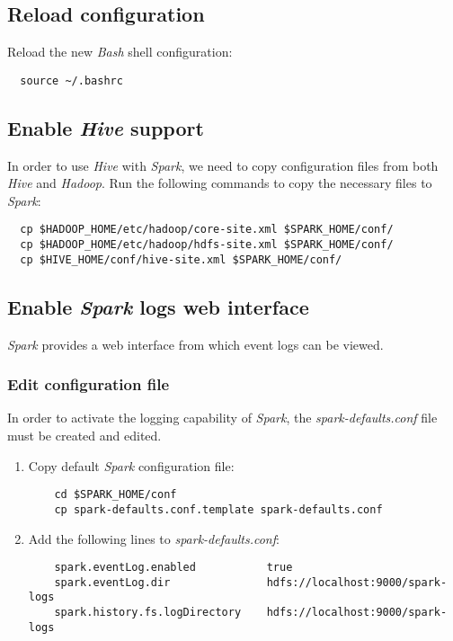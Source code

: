 \documentclass{article}
\begin{document}
  \subsection{Reload configuration}
  Reload the new \emph{Bash} shell configuration:
  \begin{verbatim}
  source ~/.bashrc
  \end{verbatim}

  \subsection{Enable \emph{Hive} support}
  In order to use \emph{Hive} with \emph{Spark}, we need to copy configuration files from both
  \emph{Hive} and \emph{Hadoop}. Run the following commands to copy the necessary files to
  \emph{Spark}:
  \begin{verbatim}
  cp $HADOOP_HOME/etc/hadoop/core-site.xml $SPARK_HOME/conf/
  cp $HADOOP_HOME/etc/hadoop/hdfs-site.xml $SPARK_HOME/conf/
  cp $HIVE_HOME/conf/hive-site.xml $SPARK_HOME/conf/
  \end{verbatim}

  \subsection{Enable \emph{Spark} logs web interface}
  \emph{Spark} provides a web interface from which event logs can be viewed.
    \subsubsection{Edit configuration file}
    In order to activate the logging capability of \emph{Spark}, the \emph{spark-defaults.conf}
    file must be created and edited.
    \begin{enumerate}
    \item Copy default \emph{Spark} configuration file:
    \begin{verbatim}
    cd $SPARK_HOME/conf
    cp spark-defaults.conf.template spark-defaults.conf
    \end{verbatim}

    \item Add the following lines to \emph{spark-defaults.conf}:
    \begin{verbatim}
    spark.eventLog.enabled           true
    spark.eventLog.dir               hdfs://localhost:9000/spark-logs
    spark.history.fs.logDirectory    hdfs://localhost:9000/spark-logs
    \end{verbatim}
    \end{enumerate}
\end{document}
